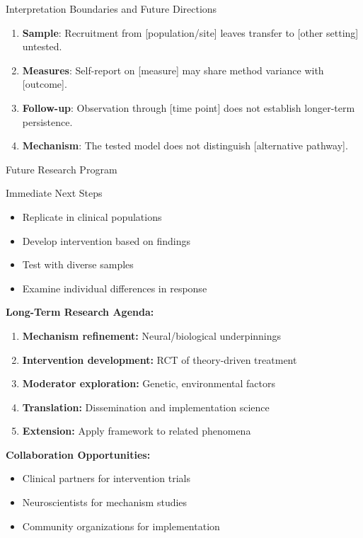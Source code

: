 \documentclass[aspectratio=169,12pt]{beamer}
\begin{document}
\begin{frame}{Interpretation Boundaries and Future Directions}
  \begin{enumerate}
    \item \textbf{Sample}: Recruitment from [population/site] leaves transfer to [other setting] untested.
    \item \textbf{Measures}: Self-report on [measure] may share method variance with [outcome].
    \item \textbf{Follow-up}: Observation through [time point] does not establish longer-term persistence.
    \item \textbf{Mechanism}: The tested model does not distinguish [alternative pathway].
  \end{enumerate}
\end{frame}

\begin{frame}{Future Research Program}
  \begin{block}{Immediate Next Steps}
    \begin{itemize}
      \item Replicate in clinical populations
      \item Develop intervention based on findings
      \item Test with diverse samples
      \item Examine individual differences in response
    \end{itemize}
  \end{block}

  \vspace{0.5cm}

  \textbf{Long-Term Research Agenda:}
  \begin{enumerate}
    \item \textbf{Mechanism refinement:} Neural/biological underpinnings
    \item \textbf{Intervention development:} RCT of theory-driven treatment
    \item \textbf{Moderator exploration:} Genetic, environmental factors
    \item \textbf{Translation:} Dissemination and implementation science
    \item \textbf{Extension:} Apply framework to related phenomena
  \end{enumerate}

  \vspace{0.5cm}

  \textbf{Collaboration Opportunities:}
  \begin{itemize}
    \item Clinical partners for intervention trials
    \item Neuroscientists for mechanism studies
    \item Community organizations for implementation
  \end{itemize}
\end{frame}
\end{document}
